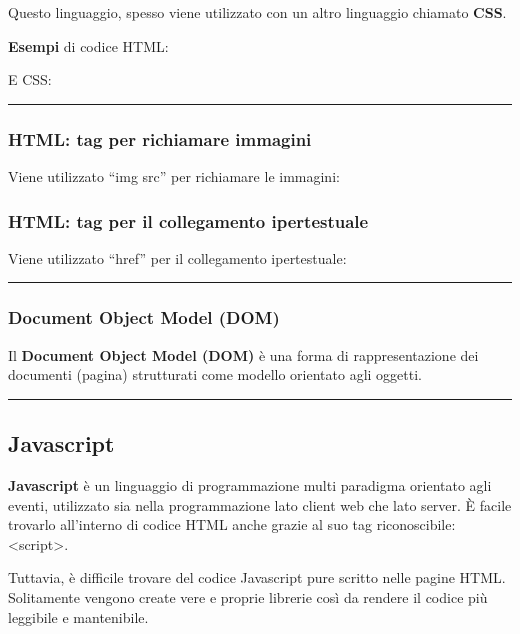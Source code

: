 \documentclass[a4paper]{article}
\newcommand{\longline}{\noindent\rule{\textwidth}{0.4pt}}
\newcommand{\dquotes}[1]{``#1''}
\begin{document}
	\noindent
	Questo linguaggio, spesso viene utilizzato con un altro linguaggio chiamato \textbf{CSS}.\newline
	
	\noindent
	\textcolor{Green4}{\textbf{Esempi}} di codice HTML:
	
	E CSS:
	
	
	\longline
	
	\subsubsection{HTML: tag per richiamare immagini}
	
	Viene utilizzato \dquotes{\textsf{img src}} per richiamare le immagini:
	\newpage
	
	\subsubsection{HTML: tag per il collegamento ipertestuale}
	
	Viene utilizzato \dquotes{\textsf{href}} per il collegamento ipertestuale:
	
	
	\longline
	
	\subsubsection{Document Object Model (DOM)}
	
	Il \textcolor{Red3}{\textbf{Document Object Model (DOM)}} è una forma di rappresentazione dei documenti (pagina) strutturati come modello orientato agli oggetti.
	
	\longline
	
	\subsection{Javascript}
	
	\textcolor{Red3}{\textbf{Javascript}} è un linguaggio di programmazione multi paradigma orientato agli eventi, utilizzato sia nella programmazione lato client web che lato server. È facile trovarlo all'interno di codice HTML anche grazie al suo tag riconoscibile: \textsf{<script>}.
	
	Tuttavia, è difficile trovare del codice Javascript pure scritto nelle pagine HTML. Solitamente vengono create vere e proprie librerie così da rendere il codice più leggibile e mantenibile.\newline
	
\end{document}
